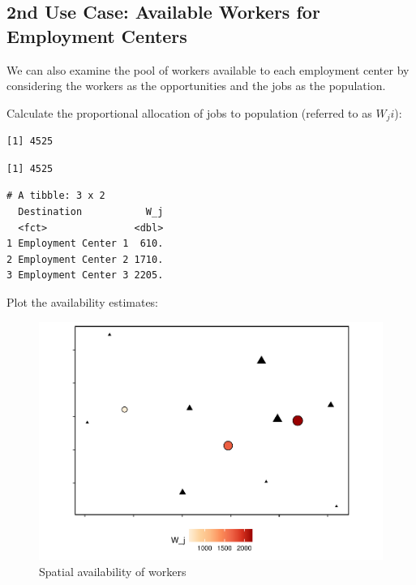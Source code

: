 \documentclass[]{elsarticle} %
\begin{document}
\hypertarget{nd-use-case-available-workers-for-employment-centers}{%
\subsection{2nd Use Case: Available Workers for Employment
Centers}\label{nd-use-case-available-workers-for-employment-centers}}

We can also examine the pool of workers available to each employment
center by considering the workers as the opportunities and the jobs as
the population.

Calculate the proportional allocation of jobs to population (referred to
as \(W_ji\)):

\begin{verbatim}
[1] 4525
\end{verbatim}

\begin{verbatim}
[1] 4525
\end{verbatim}

\begin{verbatim}
# A tibble: 3 x 2
  Destination           W_j
  <fct>               <dbl>
1 Employment Center 1  610.
2 Employment Center 2 1710.
3 Employment Center 3 2205.
\end{verbatim}

Plot the availability estimates:

\begin{figure}
\includegraphics[width=1\linewidth]{Spatial-Availability_files/figure-latex/toy-example-availability-workers-1} \caption{\label{fig:toy-example-availability-workers}Spatial availability of workers}\label{fig:toy-example-availability-workers}
\end{figure}
\end{document}
